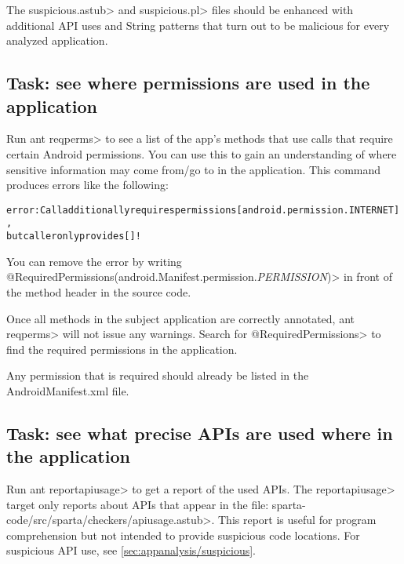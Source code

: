 The \<suspicious.astub> and \<suspicious.pl> files should be enhanced
with additional API uses and String patterns that turn out to be 
malicious for every analyzed application. 


\subsection{Task: see where permissions are used in the application}
\label{sec:appanalysis/reqperms}

Run \<ant reqperms>  to see a list of the app's methods
that use calls that require certain Android permissions. You can use
this to gain an understanding of where sensitive information may come
from/go to in the application. This command produces errors like the following:
\begin{alltt}
error: Call additionally requires permissions [android.permission.INTERNET], 
   but caller only provides []!
\end{alltt}
You can remove the error by writing
\<@RequiredPermissions({android.Manifest.permission.\emph{PERMISSION}})> in front of the method header in the source code.

Once all methods in the subject application are correctly annotated,
\<ant reqperms> will not issue any warnings.
Search for \<@RequiredPermissions> to find the required permissions
in the application.

Any permission that is required should already be listed in the AndroidManifest.xml file. 





\subsection{Task: see what precise APIs are used where in the application}

Run \<ant reportapiusage> to get a report of the used APIs. The
\<reportapiusage> target only reports about APIs that appear in the file:
\<sparta-code/src/sparta/checkers/apiusage.astub>. This report is useful
for program comprehension but not intended to provide suspicious code
locations. For suspicious API use, see
\ref{sec:appanalysis/suspicious}.

